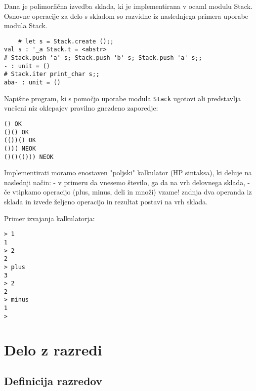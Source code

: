 \begin{ex} 
Dana je polimorfi\v cna izvedba sklada, ki je implementirana v ocaml modulu Stack. Osnovne operacije za delo s skladom so razvidne iz naslednjega primera uporabe modula Stack.


\begin{verbatim}
	# let s = Stack.create ();;
val s : '_a Stack.t = <abstr>
# Stack.push 'a' s; Stack.push 'b' s; Stack.push 'a' s;;
- : unit = ()
# Stack.iter print_char s;;
aba- : unit = ()
\end{verbatim}

Napi\v site program, ki s pomo\v cjo uporabe modula \texttt{Stack} ugotovi ali predstavlja vne\v seni niz oklepajev pravilno gnezdeno zaporedje:

\begin{verbatim}
() OK
()() OK
(())() OK
())( NEOK
()()(())) NEOK
\end{verbatim}

\end{ex}
\begin{ex}
Implementirati moramo enostaven "poljski" kalkulator (HP sintaksa), ki deluje na naslednji na\v cin:
- v primeru da vnesemo \v stevilo, ga da na vrh delovnega sklada,
- \v ce vtipkamo operacijo (plus, minus, deli in mno\v zi) vzame! zadnja dva operanda iz sklada in izvede \v zeljeno operacijo in rezultat postavi na vrh sklada.

Primer izvajanja kalkulatorja:
\begin{verbatim}
> 1
1
> 2
2
> plus
3
> 2
2
> minus
1
>
\end{verbatim}
\end{ex}

\chapter{Delo z razredi}

\section{Definicija razredov}



